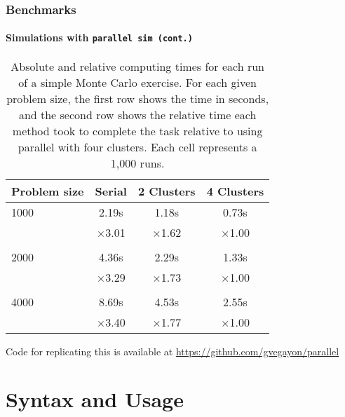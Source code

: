 \documentclass[9pt,\ExtraDocOpts]{beamer}
\begin{document}
\begin{frame}[t]
	\frametitle{Benchmarks}
	\framesubtitle{Simulations with \tt{parallel sim} (cont.)}
	
	\begin{table}[!h]
\centering\begin{tabular}{l*{3}{c}}
	\toprule
	Problem size & Serial & 2 Clusters & 4 Clusters\\\midrule
	1000 &   2.19s &   1.18s &   0.73s \\    
	&  $\times$3.01 &  $\times$1.62 &  $\times$1.00 \\ \\
	2000 &   4.36s &   2.29s &   1.33s \\    
	&  $\times$3.29 &  $\times$1.73 &  $\times$1.00 \\ \\
	4000 &   8.69s &   4.53s &   2.55s \\    
	&  $\times$3.40 &  $\times$1.77 &  $\times$1.00 \\
	\bottomrule
\end{tabular}
		\caption{Absolute and relative computing times for each run of a simple Monte Carlo exercise. For each given problem size, the first row shows the time in seconds, and the second row shows the relative time each method took to complete the task relative to using parallel with four clusters. Each cell represents a 1,000 runs.}
	\end{table}
	
Code for replicating this is available at \url{https://github.com/gvegayon/parallel}
	
\end{frame}

\section{Syntax and Usage}

\frame{\tableofcontents[currentsection]}
\end{document}
